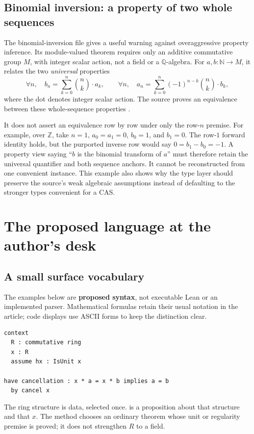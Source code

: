 \documentclass[11pt,letterpaper]{article}
\newcommand{\code}[1]{\texttt{\detokenize{#1}}}
\newcommand{\N}{\mathbb N}
\newcommand{\Z}{\mathbb Z}
\newcommand{\Q}{\mathbb Q}
\theoremstyle{definition}
\theoremstyle{remark}
\begin{document}
\subsection{Binomial inversion: a property of two whole sequences}
The binomial-inversion file gives a useful warning against overaggressive
property inference. Its module-valued theorem requires only an additive
commutative group $M$, with integer scalar action, not a field or a
$\Q$-algebra. For $a,b:\N\to M$, it relates the two \emph{universal} properties
\[
 \forall n,\quad b_n=\sum_{k=0}^n\binom nk\mathbin{\cdot}a_k,
 \qquad
 \forall n,\quad a_n=\sum_{k=0}^n(-1)^{n-k}\binom nk\mathbin{\cdot}b_k,
\]
where the dot denotes integer scalar action. The source proves an equivalence
between these whole-sequence properties \cite{binomial}.

It does not assert an equivalence row by row under only the row-$n$ premise.
For example, over $\Z$, take $n=1$, $a_0=a_1=0$, $b_0=1$, and $b_1=0$.
The row-$1$ forward identity holds, but the purported inverse row would say
$0=b_1-b_0=-1$. A property view saying ``$b$ is the binomial transform of $a$''
must therefore retain the universal quantifier and both sequence anchors.
It cannot be reconstructed from one convenient instance. This example also
shows why the type layer should preserve the source's weak algebraic
assumptions instead of defaulting to the stronger types convenient for a CAS.

\section{The proposed language at the author's desk}\label{sec:surface}

\subsection{A small surface vocabulary}
The examples below are \textbf{proposed syntax}, not executable Lean or an
implemented parser. Mathematical formulas retain their usual notation in the
article; code displays use ASCII forms to keep the distinction clear.

\begin{lstlisting}
context
  R : commutative ring
  x : R
  assume hx : IsUnit x

have cancellation : x * a = x * b implies a = b
  by cancel x
\end{lstlisting}
The ring structure is data, selected once. \code{IsUnit x} is a proposition about
that structure and that $x$. The method \code{cancel} chooses an ordinary theorem
whose unit or regularity premise is proved; it does not strengthen $R$ to a field.
\end{document}
